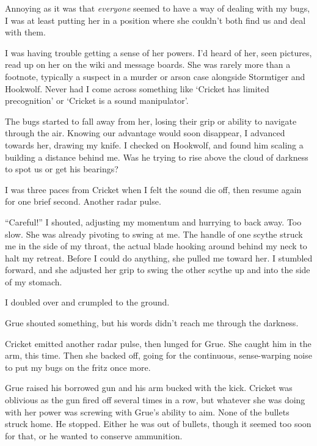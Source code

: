 Annoying as it was that \emph{everyone} seemed to have a way of dealing with my bugs, I was at least putting her in a position where she couldn't both find us and deal with them.



I was having trouble getting a sense of her powers.  I'd heard of her, seen pictures, read up on her on the wiki and message boards.  She was rarely more than a footnote, typically a suspect in a murder or arson case alongside Stormtiger and Hookwolf.  Never had I come across something like `Cricket has limited precognition' or `Cricket is a sound manipulator'.



The bugs started to fall away from her, losing their grip or ability to navigate through the air.  Knowing our advantage would soon disappear, I advanced towards her, drawing my knife.  I checked on Hookwolf, and found him scaling a building a distance behind me.  Was he trying to rise above the cloud of darkness to spot us or get his bearings?



I was three paces from Cricket when I felt the sound die off, then resume again for one brief second.  Another radar pulse.



``Careful!'' I shouted, adjusting my momentum and hurrying to back away.  Too slow.  She was already pivoting to swing at me.  The handle of one scythe struck me in the side of my throat, the actual blade hooking around behind my neck to halt my retreat.  Before I could do anything, she pulled me toward her.  I stumbled forward, and she adjusted her grip to swing the other scythe up and into the side of my stomach.



I doubled over and crumpled to the ground.



Grue shouted something, but his words didn't reach me through the darkness.



Cricket emitted another radar pulse, then lunged for Grue.  She caught him in the arm, this time.  Then she backed off, going for the continuous, sense-warping noise to put my bugs on the fritz once more.



Grue raised his borrowed gun and his arm bucked with the kick.  Cricket was oblivious as the gun fired off several times in a row, but whatever she was doing with her power was screwing with Grue's ability to aim.  None of the bullets struck home.  He stopped.  Either he was out of bullets, though it seemed too soon for that, or he wanted to conserve ammunition.



